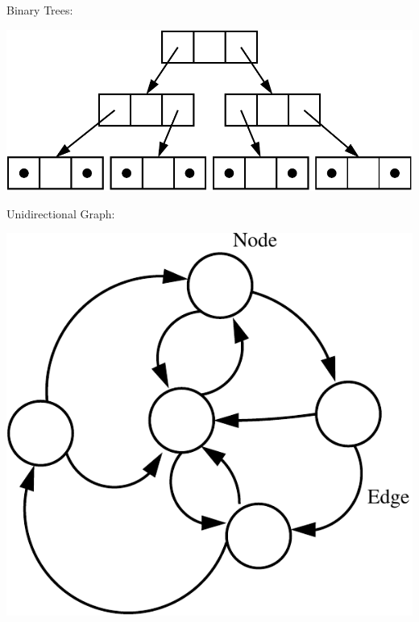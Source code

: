 \begin{frame}[fragile]
\begin{columns}[T]
\begin{column}{0.45\textwidth}
\pause
Binary Trees:
\begin{center}
\includegraphics[scale=0.25]{../Images/tree.pdf}
\end{center}
\pause
Unidirectional Graph:
\begin{center}
\includegraphics[scale=0.25]{../Images/graph.pdf}
\end{center}
\end{column}

\end{columns}
\end{frame}


